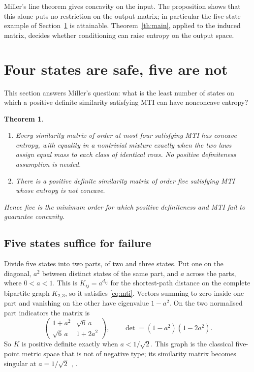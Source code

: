 \documentclass[11pt,a4paper]{article}
\newtheorem{theorem}{Theorem}
\theoremstyle{remark}
\begin{document}
Miller's line theorem \cite[Theorem 4.4]{miller} gives concavity on the input. The proposition shows that this alone puts no restriction on the output matrix; in particular the five-state example of Section~\ref{sec:min} is attainable. Theorem~\ref{th:main}, applied to the induced matrix, decides whether conditioning can raise entropy on the output space.

\section{Four states are safe, five are not}\label{sec:min}
This section answers Miller's question: what is the least number of states on which a positive definite similarity satisfying MTI can have nonconcave entropy?

\begin{theorem}\label{th:min}
\begin{enumerate}
\item[(a)] Every similarity matrix of order at most four satisfying MTI has concave entropy, with equality in a nontrivial mixture exactly when the two laws assign equal mass to each class of identical rows. No positive definiteness assumption is needed.
\item[(b)] There is a positive definite similarity matrix of order five satisfying MTI whose entropy is not concave.
\end{enumerate}
Hence five is the minimum order for which positive definiteness and MTI fail to guarantee concavity.
\end{theorem}

\subsection{Five states suffice for failure}\label{sec:five}
Divide five states into two parts, of two and three states. Put one on the diagonal, $a^2$ between distinct states of the same part, and $a$ across the parts, where $0<a<1$. This is $K_{ij}=a^{d_{ij}}$ for the shortest-path distance on the complete bipartite graph $K_{2,3}$, so it satisfies \eqref{eq:mti}. Vectors summing to zero inside one part and vanishing on the other have eigenvalue $1-a^2$. On the two normalised part indicators the matrix is
\[
 \begin{pmatrix}1+a^2&\sqrt6\,a\\ \sqrt6\,a&1+2a^2\end{pmatrix},
 \qquad\det=(1-a^2)(1-2a^2).
\]
So $K$ is positive definite exactly when $a<1/\sqrt2$. This graph is the classical five-point metric space that is not of negative type; its similarity matrix becomes singular at $a=1/\sqrt2$ \cite[Example 2.2.7]{leinster-mag}, \cite[Section 3.2]{meckes}.
\end{document}
